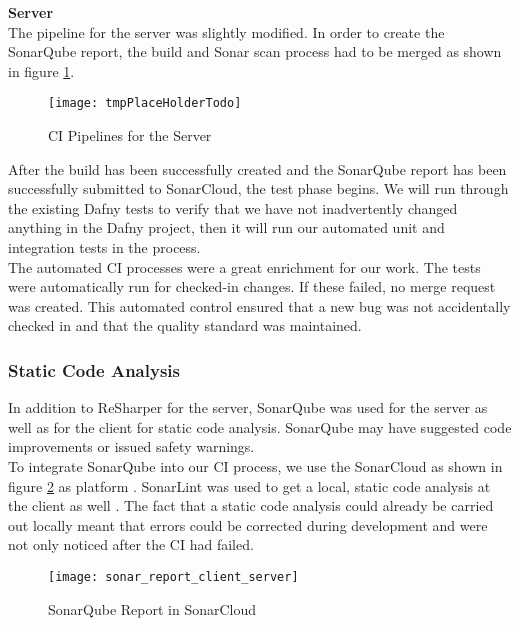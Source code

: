 {\bf Server}\\
The pipeline for the server was slightly modified.
In order to create the SonarQube report, the build and Sonar scan process had to be merged
as shown in figure \ref{fig:ci_server}.

\begin{figure}[H]
    \centering
    \texttt{[image: tmpPlaceHolderTodo]}
    \caption{CI Pipelines for the Server}
    \label{fig:ci_server}
\end{figure}

After the build has been successfully created
and the SonarQube report has been successfully submitted to SonarCloud,
the test phase begins.
We will run through the existing Dafny tests to verify
that we have not inadvertently changed anything in the Dafny project,
then it will run our automated unit and integration tests in the  process. \\

The automated CI processes were a great enrichment for our work.
The tests were automatically run for checked-in changes.
If these failed, no merge request was created.
This automated control ensured that a new bug was not accidentally checked in
and that the quality standard was maintained.

\subsubsection{Static Code Analysis}
In addition to ReSharper for the server, SonarQube was used for the server as well as for the client for static code analysis.
SonarQube may have suggested code improvements or issued safety warnings. \\

To integrate SonarQube into our CI process, we use the SonarCloud as shown in figure \ref{fig:sonarcloud_report}
as platform \cite{sonarcloud}.
SonarLint was used to get a local, static code analysis at the client as well \cite{sonar-lint}.
The fact that a static code analysis could already be carried out locally meant that errors
could be corrected during development and were not only noticed after the CI had failed.

\begin{figure}[H]
    \centering
    \texttt{[image: sonar\_report\_client\_server]}
    \caption{SonarQube Report in SonarCloud}
    \label{fig:sonarcloud_report}
\end{figure}


